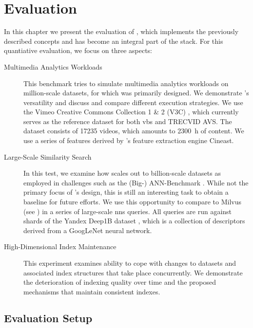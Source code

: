 \chapter{Evaluation}
\label{chapter:evaluation}

In this chapter we present the evaluation of \cottontail{} \cite{Gasser:2020Cottontail}, which implements the previously described concepts and has become an integral part of the \vitrivr{} \cite{Rossetto:2016Vitrivr,Gasser:2019Towards,Gasser:2019Multimodal} stack. For this quantiative evaluation, we focus on three aspects:

\begin{description}
    \item[Multimedia Analytics Workloads] This benchmark tries to simulate multimedia analytics workloads on million-scale datasets, for which \cottontail{} was primarily designed. We demonstrate \cottontail{}'s versatility and discuss and compare different execution strategies. We use the Vimeo Creative Commons Collection 1 \& 2 (V3C) \cite{Berns:2019V3C1,Rossetto:2021Insights}, which currently serves as the reference dataset for both \acrshort{vbs} and TRECVID AVS. The dataset consists of 17235 videos, which amounts to \SI{2300}{\hour} of content. We use a series of features derived by \vitrivr{}'s feature extraction engine Cineast.
    \item[Large-Scale Similarity Search] In this test, we examine how \cottontail{} scales out to billion-scale datasets as employed in challenges such as the (Big-) ANN-Benchmark \cite{Aumueller:2017ANN,Simhadri:2022Results}. While not the primary focus of \cottontail{}'s design, this is still an interesting task to obtain a baseline for future efforts. We use this opportunity to compare \cottontail{} to Milvus (see ) in a series of large-scale \acrshort{nns} queries. All queries are run against shards of the Yandex Deep1B dataset \cite{Babenko:2016Efficient}, which is a collection of descriptors derived from a GoogLeNet \cite{Szegedy:2015Going} neural network.
    \item[High-Dimensional Index Maintenance] This experiment examines \cottontail{} ability to cope with changes to datasets and associated index structures that take place concurrently. We demonstrate the deterioration of indexing quality over time and the proposed mechanisms that maintain consistent indexes.
\end{description}

\section{Evaluation Setup}

